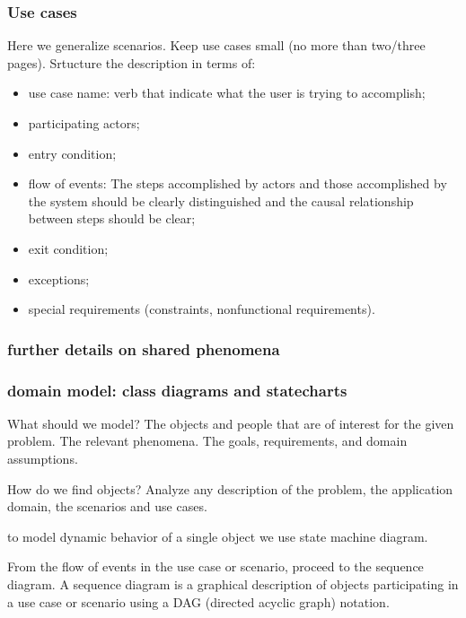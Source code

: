 \subsubsection{Use cases}
\label{subsubsect:usecases}

Here we generalize scenarios. Keep use cases small (no more than two/three pages).
Srtucture the description in terms of:
\begin{itemize}
    \item use case name: verb that indicate what the user is trying     to accomplish;
    \item participating actors;
    \item entry condition;
    \item flow of events: The steps accomplished by actors and those accomplished by the system should be clearly distinguished and the causal relationship between steps should be clear;
    \item exit condition;
    \item exceptions;
    \item special requirements (constraints, nonfunctional requirements).
\end{itemize}


\subsubsection{further details on shared phenomena}
\label{subsubsect:furtherdetailsonsharedphenomena}

\subsubsection{domain model: class diagrams and statecharts}
\label{subsubsect:domainmodel}

What should we model? The objects and people that are of interest for the given problem. The relevant phenomena. The goals, requirements, and domain assumptions.

How do we find objects? Analyze any description of the problem, the application domain, the scenarios and use cases. 

to model dynamic behavior of a single object we use state machine diagram.

From the flow of events in the use case or scenario, proceed to the sequence diagram. A sequence diagram is a graphical description of objects participating in a use case or scenario using a DAG (directed acyclic graph) notation.

